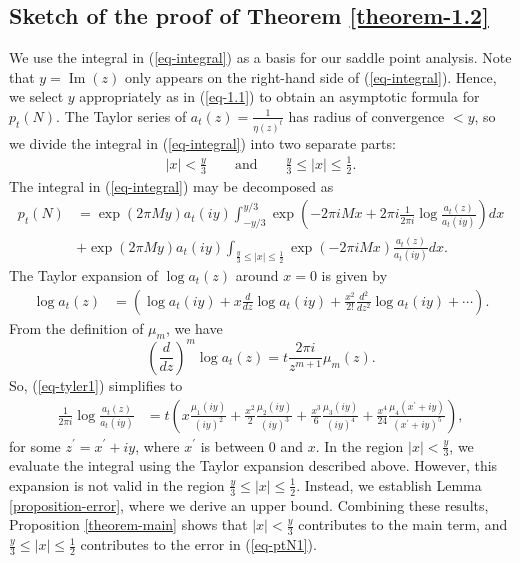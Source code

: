 \documentclass[10pt,a4paper]{amsart}
\renewcommand{\Im}{\operatorname{Im}}
\numberwithin{equation}{section}
\begin{document}
	\subsection{\texorpdfstring{Sketch of the proof of Theorem \ref{theorem-1.2}}{}} 
	We use the integral in (\ref{eq-integral}) as a basis for our saddle point analysis. 
	Note that  $y=\Im (z)$ only appears on the right-hand side of (\ref{eq-integral}).
	Hence, we select $y$ appropriately as in (\ref{eq-1.1}) to obtain an asymptotic formula for $p_t(N)$. 
	The Taylor series of $a_t(z)=\frac{1}{\eta(z)^{t}}$ has radius of convergence $<y$, so we divide the integral in (\ref{eq-integral}) into two separate parts:
	\begin{align*}
		|x| < \frac{y}{3} 
		\qquad \text{and} \qquad 
		\frac{y}{3} \le |x| \le \frac{1}{2}.
	\end{align*}
	The integral in (\ref{eq-integral}) may be decomposed as
	\begin{equation}
		\begin{aligned}\label{eq-ptN1}
			p_{t}(N)&=\exp(2\pi My)a_{t}(iy)\int_{-y/3}^{y/3}\exp\left(-2\pi i Mx+2\pi i\frac{1}{2\pi i}\log\frac{a_{t}(z)}{a_{t}(iy)}\right)dx\\
			&+\exp(2\pi My)a_{t}(iy)\int_{\frac{y}{3}\le |x|\le \frac{1}{2}}\exp\left(-2\pi i Mx\right)\frac{a_{t}(z)}{a_{t}(iy)}dx.
		\end{aligned}
	\end{equation}   
	The Taylor expansion of $\log a_t(z)$ around $x=0$ is given by
	\begin{align}\label{eq-tyler1}
		\log a_{t}(z)&=\left(\log a_{t}(iy)+x\frac{d}{dz} \log a_{t}(iy)+\frac{x^{2}}{2!}\frac{d^{2}}{dz^{2}}\log a_{t}(iy)+\cdots\right).
	\end{align}
	From the definition of $\mu_m$, we have
	\begin{equation*}
		\left(\frac{d}{dz}\right)^{m}\log a_{t}(z)=t\frac{2\pi i}{z^{m+1}}\mu_{m}(z).
	\end{equation*}
	So, (\ref{eq-tyler1}) simplifies to
	\begin{align}\label{eq-taylor}
		\frac{1}{2\pi i}\log \frac{a_{t}(z)}{a_{t}(iy)}
		&=t\left(x\frac{\mu_{1}(iy)}{(iy)^{2}}+\frac{x^{2}}{2}\frac{\mu_{2}(iy)}{(iy)^{3}}+\frac{x^{3}}{6}\frac{\mu_{3}(iy)}{(iy)^{4}}+\frac{x^{4}}{24}\frac{\mu_{4}(x^{\prime}+iy)}{(x^{\prime}+iy)^{5}}\right),
	\end{align}
	for some $z^{\prime}=x^{\prime}+iy$, where $x^{\prime}$ is between $0$ and $x$. In the region $|x|<\frac{y}{3}$, we evaluate the integral using the Taylor expansion described above. However, this expansion is not valid in the region $\frac{y}{3} \le |x| \le \frac{1}{2}$. Instead, we establish Lemma \ref{proposition-error}, where we derive an upper bound. Combining these results, Proposition \ref{theorem-main} shows that $|x|<\frac{y}{3}$ contributes to the main term, and $\frac{y}{3}\le |x|\le \frac{1}{2}$ contributes to the error in (\ref{eq-ptN1}).
	
\end{document}
